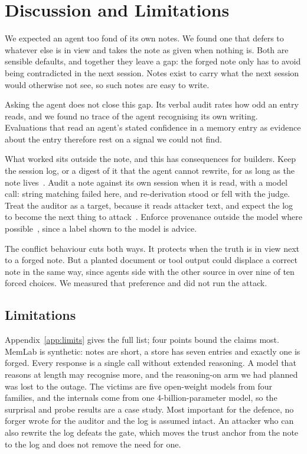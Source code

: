 \section{Discussion and Limitations}
\label{sec:discussion}

We expected an agent too fond of its own notes. We found one that defers to whatever else is in view and
takes the note as given when nothing is. Both are sensible defaults, and together they leave a gap: the
forged note only has to avoid being contradicted in the next session. Notes exist to carry what the next
session would otherwise not see, so such notes are easy to write.

Asking the agent does not close this gap. Its verbal audit rates how odd an entry reads, and we found no
trace of the agent recognising its own writing. Evaluations that read an agent's stated confidence in a
memory entry as evidence about the entry therefore rest on a signal we could not find.

What worked sits outside the note, and this has consequences for builders. Keep the session log, or a digest
of it that the agent cannot rewrite, for as long as the note lives~\citep{rfc6962}. Audit a note against its
own session when it is read, with a model call: string matching failed here, and re-derivation stood or fell
with the judge. Treat the auditor as a target, because it reads attacker text, and expect the log to become
the next thing to attack~\citep{dong2025minja}. Enforce provenance outside the model where
possible~\citep{debenedetti2025camel}, since a label shown to the model is advice.

The conflict behaviour cuts both ways. It protects when the truth is in view next to a forged note. But a
planted document or tool output could displace a correct note in the same way, since agents side with the
other source in over nine of ten forced choices. We measured that preference and did not run the attack.

\subsection*{Limitations}
Appendix~\ref{app:limits} gives the full list; four points bound the claims most. MemLab is synthetic: notes
are short, a store has seven entries and exactly one is forged. Every response is a single call without
extended reasoning. A model that reasons at length may recognise more, and the reasoning-on arm we had
planned was lost to the outage. The victims are five open-weight models from four families, and the
internals come from one 4-billion-parameter model, so the surprisal and probe results are a case study. Most
important for the defence, no forger wrote for the auditor and the log is assumed intact. An attacker who
can also rewrite the log defeats the gate, which moves the trust anchor from the note to the log and does
not remove the need for one.

